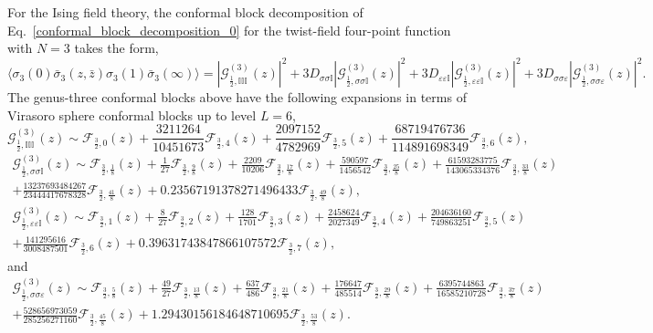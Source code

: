 \documentclass[a4paper,11pt]{article}
\begin{document}
For the Ising field theory, the conformal block decomposition of 
Eq.~\eqref{conformal_block_decomposition_0} for the twist-field 
four-point function with $N=3$ takes the form,
\begin{equation}
 \langle \sigma_3(0)\bar{\sigma}_3(z, \bar{z})\sigma_3(1)\bar{\sigma}_3(\infty)\rangle=
 |\mathcal{G}_{\frac{1}{2},\mathbb{I}\mathbb{I}\mathbb{I}}^{(3)}(z)|^2+
 3D_{\sigma\sigma\mathbb{I}}|\mathcal{G}_{\frac{1}{2},\sigma\sigma\mathbb{I}}^{(3)}(z)|^2+
 3D_{\varepsilon\varepsilon\mathbb{I}}|\mathcal{G}_{\frac{1}{2},\varepsilon\varepsilon\mathbb{I}}^{(3)}(z)|^2+
 3D_{\sigma\sigma\varepsilon}|\mathcal{G}_{\frac{1}{2},\sigma\sigma\varepsilon}^{(3)}(z)|^2.
\end{equation}
The genus-three conformal blocks above have the following 
expansions in terms of Virasoro sphere conformal blocks up to level $L=6$,
\begin{equation}
 \mathcal{G}_{\frac{1}{2},\mathbb{I}\mathbb{I}\mathbb{I}}^{(3)}(z)\sim
 \mathcal{F}_{\frac{3}{2}, 0}(z) + 
 \frac{3211264}{10451673} \mathcal{F}_{\frac{3}{2}, 4}(z) + 
 \frac{2097152}{4782969} \mathcal{F}_{\frac{3}{2}, 5}(z) + 
 \frac{68719476736}{114891698349}\mathcal{F}_{\frac{3}{2}, 6}(z),
\end{equation}
\begin{multline}
 \mathcal{G}_{\frac{1}{2},\sigma\sigma\mathbb{I}}^{(3)}(z)\sim
 \mathcal{F}_{\frac{3}{2},\frac{1}{8}}(z) + 
 \frac{1}{27} \mathcal{F}_{\frac{3}{2}, \frac{9}{8}}(z) + 
 \frac{2209}{10206} \mathcal{F}_{\frac{3}{2}, \frac{17}{8}}(z) + 
 \frac{590597}{1456542} \mathcal{F}_{\frac{3}{2}, \frac{25}{8}}(z) + 
 \frac{61593283775}{143065334376}\mathcal{F}_{\frac{3}{2}, \frac{33}{8}}(z) \\ + 
 \frac{13237693484267}{23444417678328}\mathcal{F}_{\frac{3}{2}, \frac{41}{8}}(z) + 
 0.23567191378271496433 \mathcal{F}_{\frac{3}{2}, \frac{49}{8}}(z),
\end{multline}
\begin{multline}
 \mathcal{G}_{\frac{1}{2},\varepsilon\varepsilon\mathbb{I}}^{(3)}(z)\sim
 \mathcal{F}_{\frac{3}{2}, 1}(z)+ 
 \frac{8}{27} \mathcal{F}_{\frac{3}{2}, 2}(z)+ 
 \frac{128}{1701}\mathcal{F}_{\frac{3}{2}, 3}(z) + 
 \frac{2458624}{2027349}\mathcal{F}_{\frac{3}{2}, 4}(z) + 
 \frac{204636160}{749863251}\mathcal{F}_{\frac{3}{2}, 5}(z) \\+ 
 \frac{141295616}{3008487501}\mathcal{F}_{\frac{3}{2},6}(z) + 
 0.39631743847866107572\mathcal{F}_{\frac{3}{2}, 7}(z),
\end{multline}
and
\begin{multline}
 \mathcal{G}_{\frac{1}{2},\sigma\sigma\varepsilon}^{(3)}(z)\sim
 \mathcal{F}_{\frac{3}{2}, \frac{5}{8}}(z) + 
 \frac{49}{27}\mathcal{F}_{\frac{3}{2}, \frac{13}{8}}(z) + 
 \frac{637}{486}\mathcal{F}_{\frac{3}{2}, \frac{21}{8}}(z) + 
 \frac{176647}{485514}\mathcal{F}_{\frac{3}{2}, \frac{29}{8}}(z) + 
 \frac{6395744863}{16585210728}\mathcal{F}_{\frac{3}{2}, \frac{37}{8}}(z) \\ + 
 \frac{528656973059}{285256271160}\mathcal{F}_{\frac{3}{2}, \frac{45}{8}}(z) + 
 1.29430156184648710695\mathcal{F}_{\frac{3}{2}, \frac{53}{8}}(z).
\end{multline}
\end{document}
